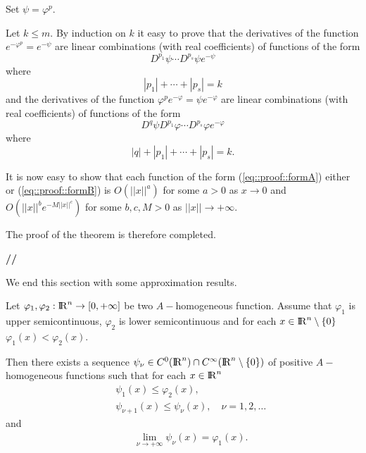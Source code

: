 \documentclass[12pt,a4paper]{amsart}
\begin{document}
{{Set ${\psi}={\varphi}^{p}$.

Let ${k}\leq{m}$.
By induction on ${k}$ it easy to prove that
the derivatives of the function 
$e^{-{\varphi}^{p}}=e^{-{\psi}}$
are linear combinations (with real coefficients) of functions
of the form
\begin{equation}\label{eq::proof::formA}
	{D}^{{p}_1}{\psi}
	\cdots
	{D}^{{p}_{s}}{\psi}
	e^{-{\psi}}
\end{equation}
where
\begin{equation}\nonumber
	{\left|{{p}_1}\right|}+\cdots+{\left|{{p}_{s}}\right|}={k}
\end{equation}
and the derivatives of the function 
${\varphi}^{p} e^{-{\varphi}}={\psi} e^{-{\varphi}}$
are linear combinations (with real coefficients) of functions
of the form
\begin{equation}\label{eq::proof::formB}
	{D}^{q}{\psi}
	{D}^{{p}_1}{\varphi}
	\cdots
	{D}^{{p}_{s}}{\varphi}
	e^{-{\varphi}}
\end{equation}
where
\begin{equation}\nonumber
	{\left|{q}\right|}+{\left|{{p}_1}\right|}+\cdots+{\left|{{p}_{s}}\right|}={k}.
\end{equation}

It is now easy to show that each function of the form
(\ref{eq::proof::formA}) either or (\ref{eq::proof::formB})
is $O({\left|\!\left|{x}\right|\!\right|}^a)$ for some $a>0$ as ${x}\to0$
and $O({\left|\!\left|{x}\right|\!\right|}^b e^{-M{\left|\!\left|{x}\right|\!\right|}^c})$ for some $b,c,M>0$
as ${\left|\!\left|{x}\right|\!\right|}\to+\infty$.

The proof of the theorem is therefore completed.

} {{\bf //}\par\smallskip}

We end this section with some approximation results.

\begin{proposition}\label{thm::HomogeneousApproximationOne}
Let ${\varphi}_1,{\varphi}_2:{{\rm I\kern-.185em R}}^{n}\to[0,+\infty]$ be
two ${A}-$homogeneous function.
Assume that ${\varphi}_1$ is upper semicontinuous,
${\varphi}_2$ is lower semicontinuous
and for each ${x}\in{{\rm I\kern-.185em R}}^n\setminus\{0\}$
${\varphi}_1({x})<{\varphi}_2({x})$.

Then there exists a sequence
${\psi}_{\nu}\in C^0({{\rm I\kern-.185em R}}^{n})\cap C^\infty({{\rm I\kern-.185em R}}^{n}\setminus\{0\})$
of positive ${A}-$homogeneous functions such that
for each ${x}\in{{\rm I\kern-.185em R}}^{n}$
\begin{eqnarray}
&&{\psi}_{1}({x})\leq{\varphi}_{2}({x}),
\nonumber\\
&&{\psi}_{{\nu}+1}({x})\leq{\psi}_{\nu}({x}),
\quad{\nu}=1,2,\ldots
\nonumber
\end{eqnarray}
and
\begin{eqnarray}
\nonumber&&\lim_{{\nu}\to+\infty}{\psi}_{\nu}({x})={\varphi}_{1}({x}).
\end{eqnarray}
\end{proposition}

}
\end{document}
